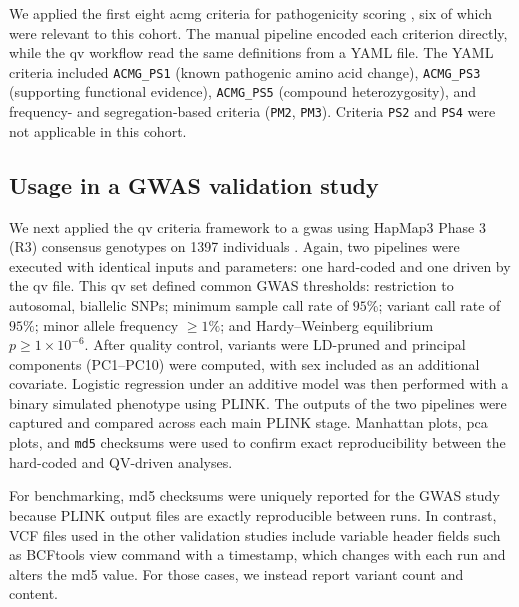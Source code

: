 \documentclass[unnumsec,webpdf,contemporary,large,namedate]{oup-authoring-template}
\begin{document}
We applied the first eight \ac{acmg} criteria for pathogenicity scoring \citep{richards2015standards}, six of which were relevant to this cohort. The manual pipeline encoded each criterion directly, while the \ac{qv} workflow read the same definitions from a YAML file. %
The YAML criteria included \texttt{ACMG\_PS1} (known pathogenic amino acid change), \texttt{ACMG\_PS3} (supporting functional evidence), \texttt{ACMG\_PS5} (compound heterozygosity), and frequency- and segregation-based criteria (\texttt{PM2}, \texttt{PM3}). Criteria \texttt{PS2} and \texttt{PS4} were not applicable in this cohort.

\subsection{Usage in a GWAS validation study}
We next applied the \ac{qv} criteria framework to a \ac{gwas} using HapMap3 Phase 3 (R3) consensus genotypes on 1397 individuals \citep{2020fairleyInternationalGenomeSample}. Again, two pipelines were executed with identical inputs and parameters: one hard-coded and one driven by the \ac{qv}  file.
This \ac{qv}  set defined common GWAS thresholds: restriction to autosomal, biallelic SNPs; minimum sample call rate of $95\%$; variant call rate of $95\%$; minor allele frequency $\geq 1\%$; and Hardy–Weinberg equilibrium $p \geq 1\times10^{-6}$. After quality control, variants were LD-pruned and principal components (PC1–PC10) were computed, with sex included as an additional covariate. Logistic regression under an additive model was then performed with a binary simulated phenotype using PLINK.
The outputs of the two pipelines were captured and compared across each main PLINK stage. Manhattan plots, \ac{pca} plots, and \texttt{md5} checksums were used to confirm exact reproducibility between the hard-coded and QV-driven analyses.

For benchmarking, \ac{md5} checksums were uniquely reported for the GWAS study because PLINK output files are exactly reproducible between runs. In contrast, VCF files used in the other validation studies include variable header fields such as BCFtools view command with a timestamp, which changes with each run and alters the \ac{md5} value. For those cases, we instead report variant count and content.
\end{document}
